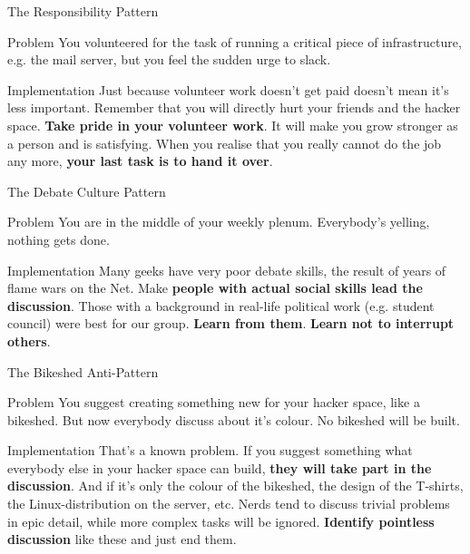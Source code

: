 \documentclass[mathserif]{beamer}
\begin{document}
\begin{frame}{The Responsibility Pattern}
	\begin{alertblock}{Problem}
		You volunteered for the task of running a critical piece of infrastructure,
		e.g. the mail server, but you feel the sudden urge to slack.
	\end{alertblock}
	\pause
	\begin{exampleblock}{Implementation}
		Just because volunteer work doesn't get paid doesn't mean it's less
		important.  Remember that you will directly hurt your friends and the hacker
		space.  \textbf{Take pride in your volunteer work}.  It will make you grow
		stronger as a person and is satisfying.  When you realise that you really
		cannot do the job any more, \textbf{your last task is to hand it over}.
	\end{exampleblock}
\end{frame}

\begin{frame}{The Debate Culture Pattern}
	\begin{alertblock}{Problem}
		You are in the middle of your weekly plenum.  Everybody's yelling, nothing
		gets done.
	\end{alertblock}
	\pause
	\begin{exampleblock}{Implementation}
		Many geeks have very poor debate skills, the result of years of flame wars
		on the Net.  Make \textbf{people with actual social skills lead the
		discussion}.  Those with a background in real-life political work (e.g.
		student council) were best for our group.  \textbf{Learn from them}.
		\textbf{Learn not to interrupt others}.
	\end{exampleblock}
\end{frame}

\begin{frame}{The Bikeshed Anti-Pattern}
	\begin{alertblock}{Problem}
		You suggest creating something new for your hacker space, like a bikeshed.
		But now everybody discuss about it's colour.  No bikeshed will be built.
	\end{alertblock}
	\pause
	\begin{exampleblock}{Implementation}
		That's a known problem.  If you suggest something what everybody else in
		your hacker space can build, \textbf{they will take part in the
		discussion}.  And if it's only the colour of the bikeshed, the design of the
		T-shirts, the Linux-distribution on the server, etc.  Nerds tend to discuss
		trivial problems in epic detail, while more complex tasks will be ignored.
		\textbf{Identify pointless discussion} like these and just end them.
	\end{exampleblock}
\end{frame}
\end{document}
